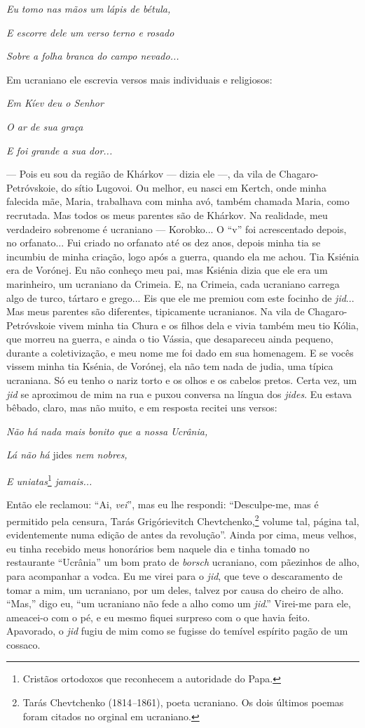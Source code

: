 \emph{Eu} \emph{tomo nas mãos um lápis de bétula, }

\emph{E escorre dele um verso terno e rosado}

\emph{Sobre a folha branca do campo nevado...}

Em ucraniano ele escrevia versos mais individuais e religiosos:

\emph{Em Kíev deu o Senhor}

\emph{O ar de sua graça}

\emph{E foi grande a sua dor...}

--- Pois eu sou da região de Khárkov --- dizia ele ---, da vila de
Chagaro-Petróvskoie, do sítio Lugovoi. Ou melhor, eu nasci em Kertch,
onde minha falecida mãe, Maria, trabalhava com minha avó, também chamada
Maria, como recrutada. Mas todos os meus parentes são de Khárkov. Na
realidade, meu verdadeiro sobrenome é ucraniano --- Korobko... O ``v''
foi acrescentado depois, no orfanato... Fui criado no orfanato até os
dez anos, depois minha tia se incumbiu de minha criação, logo após a
guerra, quando ela me achou. Tia Ksiénia era de Vorónej. Eu não conheço
meu pai, mas Ksiénia dizia que ele era um marinheiro, um ucraniano da
Crimeia. E, na Crimeia, cada ucraniano carrega algo de turco, tártaro e
grego... Eis que ele me premiou com este focinho de \emph{jid}... Mas
meus parentes são diferentes, tipicamente ucranianos. Na vila de
Chagaro-Petróvskoie vivem minha tia Chura e os filhos dela e vivia
também meu tio Kólia, que morreu na guerra, e ainda o tio Vássia, que
desapareceu ainda pequeno, durante a coletivização, e meu nome me foi
dado em sua homenagem. E se vocês vissem minha tia Ksénia, de Vorónej,
ela não tem nada de judia, uma típica ucraniana. Só eu tenho o nariz
torto e os olhos e os cabelos pretos. Certa vez, um \emph{jid} se
aproximou de mim na rua e puxou conversa na língua dos \emph{jides}. Eu
estava bêbado, claro, mas não muito, e em resposta recitei uns versos:

\emph{Não há nada mais bonito que a nossa Ucrânia, }

\emph{Lá não há} jides \emph{nem nobres,}

\emph{E uniatas}\footnote{Cristãos ortodoxos que reconhecem a autoridade
  do Papa.} \emph{jamais... }

Então ele reclamou: ``Ai, \emph{vei}'', mas eu lhe respondi:
``Desculpe-me, mas é permitido pela censura, Tarás Grigórievitch
Chevtchenko,\footnote{Tarás Chevtchenko (1814\emph{--}1861), poeta
  ucraniano. Os dois últimos poemas foram citados no orginal em
  ucraniano.} volume tal, página tal, evidentemente numa edição de antes
da revolução''. Ainda por cima, meus velhos, eu tinha recebido meus
honorários bem naquele dia e tinha tomadо no restaurante ``Ucrânia'' um
bom prato de \emph{borsch} ucraniano, com pãezinhos de alho, para
acompanhar a vodca. Eu me virei para o \emph{jid}, que teve o
descaramento de tomar a mim, um ucraniano, por um deles, talvez por
causa do cheiro de alho. ``Mas,'' digo eu, ``um ucraniano não fede a
alho como um \emph{jid}.'' Virei-me para ele, ameacei-o com o pé, e eu
mesmo fiquei surpreso com o que havia feito. Apavorado, o \emph{jid}
fugiu de mim como se fugisse do temível espírito pagão de um cossaco.

